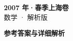 \documentclass[zihao=-4, a4paper]{ctexart}
\begin{document}
\begin{center}
  {\Large\bfseries 2007 年·春季上海卷}\\[4pt]
  {\large 数学 · 解析版}
\end{center}
\medskip
{}

\clearpage
{}
\begin{center}{\Large\bfseries 参考答案与详细解析}\end{center}
\medskip

\end{document}

